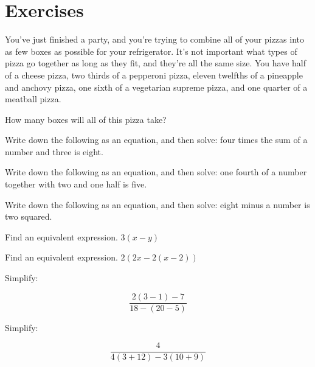 

\section*{Exercises}

\begin{exercise}
	You've just finished a party, and you're trying to combine all of your pizzas into as few boxes as possible for your refrigerator.  It's not important what types of pizza go together as long as they fit, and they're all the same size.  You have half of a cheese pizza, two thirds of a pepperoni pizza, eleven twelfths of a pineapple and anchovy pizza, one sixth of a vegetarian supreme pizza, and one quarter of a meatball pizza.
	
	How many boxes will all of this pizza take?
	
\end{exercise}
\bigskip

\begin{exercise}
	Write down the following as an equation, and then solve: four times the sum of a number and three is eight.
\end{exercise}
\bigskip

\begin{exercise}
	Write down the following as an equation, and then solve: one fourth of a number together with two and one half is five.
\end{exercise}
\bigskip

\begin{exercise}
	Write down the following as an equation, and then solve: eight minus a number is two squared.
\end{exercise}
\bigskip

\begin{exercise}
	Find an equivalent expression.  $3(x-y)$
\end{exercise}
\bigskip

\begin{exercise}
	Find an equivalent expression.  $2(2x - 2(x - 2))$
\end{exercise}
\bigskip

\begin{exercise}
	Simplify:
	
	$$\frac{2(3-1)-7}{18-(20-5)}$$
\end{exercise}
\bigskip

\begin{exercise}
	Simplify:
	
	$$\frac{4}{4(3+12)-3(10+9)}$$
\end{exercise}
\bigskip

